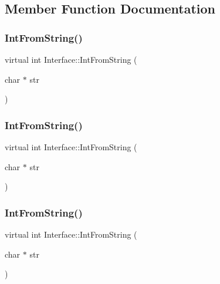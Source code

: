 \subsection{Member Function Documentation}
\mbox{\label{class_interface_ab34c8a5fd2236a6b009f86a4e5851b61}} 
\subsubsection{\texorpdfstring{IntFromString()}{IntFromString()}\hspace{0.1cm}{\footnotesize\ttfamily [1/3]}}
{\footnotesize\ttfamily virtual int Interface\+::\+Int\+From\+String (\begin{DoxyParamCaption}\item[{char $\ast$}]{str }\end{DoxyParamCaption})\hspace{0.3cm}{\ttfamily [pure virtual]}}

\mbox{\label{class_interface_ab34c8a5fd2236a6b009f86a4e5851b61}} 
\subsubsection{\texorpdfstring{IntFromString()}{IntFromString()}\hspace{0.1cm}{\footnotesize\ttfamily [2/3]}}
{\footnotesize\ttfamily virtual int Interface\+::\+Int\+From\+String (\begin{DoxyParamCaption}\item[{char $\ast$}]{str }\end{DoxyParamCaption})\hspace{0.3cm}{\ttfamily [pure virtual]}}

\mbox{\label{class_interface_ab34c8a5fd2236a6b009f86a4e5851b61}} 
\subsubsection{\texorpdfstring{IntFromString()}{IntFromString()}\hspace{0.1cm}{\footnotesize\ttfamily [3/3]}}
{\footnotesize\ttfamily virtual int Interface\+::\+Int\+From\+String (\begin{DoxyParamCaption}\item[{char $\ast$}]{str }\end{DoxyParamCaption})\hspace{0.3cm}{\ttfamily [pure virtual]}}

